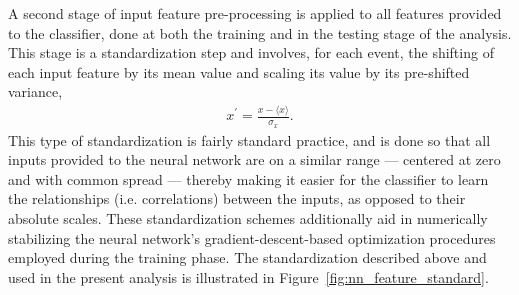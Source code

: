 A second stage of input feature pre-processing is applied to all features provided to the classifier,
done at both the training and in the testing stage of the analysis.
This stage is a standardization step and involves, for each event, the shifting of each input feature by its mean value and scaling
its value by its pre-shifted variance,
\begin{align*}
    x^{\prime} = \frac{x - \langle x \rangle}{\sigma_x}.
\end{align*}
This type of standardization is fairly standard practice, and is done so that all inputs provided
to the neural network are on a similar range --- centered at zero and with common spread --- thereby
making it easier for the classifier to learn the relationships (i.e. correlations) between the inputs,
as opposed to their absolute scales.
These standardization schemes additionally aid in numerically stabilizing the neural network's gradient-descent-based
optimization procedures employed during the training phase.
The standardization described above and used in the present analysis is illustrated in Figure~\ref{fig:nn_feature_standard}.


